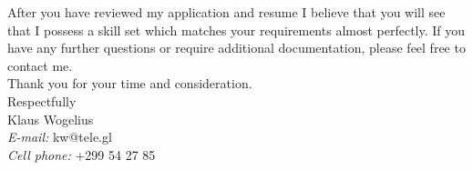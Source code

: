 \documentclass[11pt,a4paper,twoside]{article}
\begin{document}
\par
After you have reviewed my application and resume I believe that you will see that I possess a skill set which matches your requirements almost perfectly. If you have any further questions or require additional documentation, please feel free to contact me.\\[.2cm]
Thank you for your time and consideration.\\[.2cm]
Respectfully
\\[.2cm]
Klaus Wogelius\\
\textit{E-mail:} kw@tele.gl\\
\textit{Cell phone:} +299 54 27 85\\


\printbibliography[title=Referencer]
\end{document}

